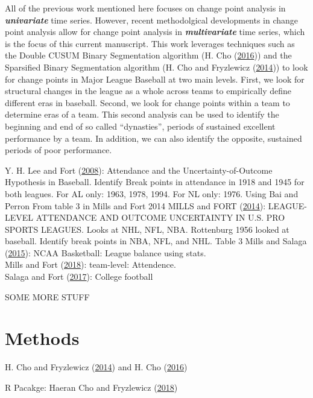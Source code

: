 \documentclass[
  12pt,
]{article}
\begin{document}
All of the previous work mentioned here focuses on change point analysis
in \textbf{\emph{univariate}} time series. However, recent methodolgical
developments in change point analysis allow for change point analysis in
\textbf{\emph{multivariate}} time series, which is the focus of this
current manuscript. This work leverages techniques such as the Double
CUSUM Binary Segmentation algorithm (H. Cho
(\protect\hyperlink{ref-Cho2016}{2016})) and the Sparsified Binary
Segmentation algorithm (H. Cho and Fryzlewicz
(\protect\hyperlink{ref-ChoFryzlewwicz2014}{2014})) to look for change
points in Major League Baseball at two main levels. First, we look for
structural changes in the league as a whole across teams to empirically
define different eras in baseball. Second, we look for change points
within a team to determine eras of a team. This second analysis can be
used to identify the beginning and end of so called ``dynasties'',
periods of sustained excellent performance by a team. In addition, we
can also identify the opposite, sustained periods of poor performance.

Y. H. Lee and Fort (\protect\hyperlink{ref-LeeFort2008}{2008}):
Attendance and the Uncertainty-of-Outcome Hypothesis in Baseball.
Identify Break points in attendance in 1918 and 1945 for both leagues.
For AL only: 1963, 1978, 1994. For NL only: 1976. Using Bai and Perron
From table 3 in Mills and Fort 2014 MILLS and FORT
(\protect\hyperlink{ref-MillsFort2014}{2014}): LEAGUE-LEVEL ATTENDANCE
AND OUTCOME UNCERTAINTY IN U.S. PRO SPORTS LEAGUES. Looks at NHL, NFL,
NBA. Rottenburg 1956 looked at baseball. Identify break points in NBA,
NFL, and NHL. Table 3 Mills and Salaga
(\protect\hyperlink{ref-MillsSalaga2015}{2015}): NCAA Basketball: League
balance using stats.\\
Mills and Fort (\protect\hyperlink{ref-MillsFort2018}{2018}):
team-level: Attendence.\\
Salaga and Fort (\protect\hyperlink{ref-SalagaFort2017}{2017}): College
football

SOME MORE STUFF

\hypertarget{methods}{%
\section{Methods}\label{methods}}

H. Cho and Fryzlewicz (\protect\hyperlink{ref-ChoFryzlewwicz2014}{2014})
and H. Cho (\protect\hyperlink{ref-Cho2016}{2016})

R Pacakge: Haeran Cho and Fryzlewicz
(\protect\hyperlink{ref-hdbinseg}{2018})
\end{document}
